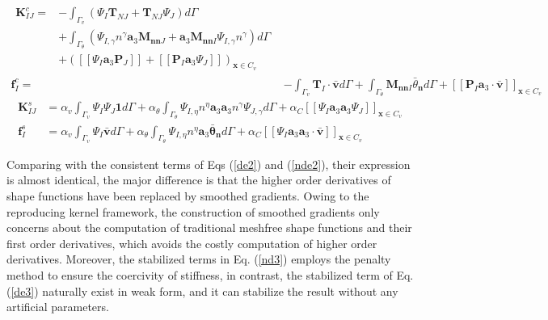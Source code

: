 \begin{subequations}\label{nde2}
\begin{align}
\begin{split}
\boldsymbol K^c_{IJ} = &- \int_{\Gamma_v} (\Psi_I \boldsymbol T_{NJ} + \boldsymbol T_{NJ} \Psi_J) d\Gamma \\
                                     &+ \int_{\Gamma_\theta} (\Psi_{I,\gamma} n^\gamma \boldsymbol a_3 \boldsymbol M_{\boldsymbol{nn}J} + \boldsymbol a_3 \boldsymbol M_{\boldsymbol{nn}I} \Psi_{I,\gamma}n^\gamma)d\Gamma \\
                                     & + ([[\Psi_I \boldsymbol a_3 \boldsymbol P_J]] + [[\boldsymbol P_I \boldsymbol a_3 \Psi_J]])_{\boldsymbol x \in C_v}
\end{split} \\
\boldsymbol f^c_I = &- \int_{\Gamma_v} \boldsymbol T_I \cdot \bar{\boldsymbol v} d\Gamma + \int_{\Gamma_\theta} \boldsymbol M_{\boldsymbol{nn}I} \bar{\theta}_{\boldsymbol n} d\Gamma + [[\boldsymbol P_I\boldsymbol a_3 \cdot \bar{\boldsymbol v}]]_{\boldsymbol x \in C_v}
\end{align}
\end{subequations}
\begin{subequations}\label{nde3}
\begin{align}
\boldsymbol K^s_{IJ} &= \alpha_v \int_{\Gamma_v} \Psi_I \Psi_J \boldsymbol 1 d\Gamma 
+ \alpha_\theta \int_{\Gamma_\theta} \Psi_{I,\eta} n^\eta \boldsymbol a_3 \boldsymbol a_3 n^\gamma\Psi_{J,\gamma} d\Gamma + \alpha_C [[\Psi_I \boldsymbol a_3 \boldsymbol a_3 \Psi_J]]_{\boldsymbol x \in C_v} \\
\boldsymbol f^s_I &= \alpha_v \int_{\Gamma_v} \Psi_I \bar{\boldsymbol v} d\Gamma + \alpha_\theta \int_{\Gamma_\theta} \Psi_{I,\eta} n^\eta \boldsymbol a_3 \boldsymbol \bar \theta_{\boldsymbol n} d\Gamma + \alpha_C [[\Psi_I \boldsymbol a_3 \boldsymbol a_3 \cdot \bar{\boldsymbol v}]]_{\boldsymbol x \in C_v}
\end{align}
\end{subequations}

Comparing with the consistent terms of Eqs (\ref{de2}) and (\ref{nde2}), their expression is almost identical, the major difference is that the higher order derivatives of shape functions have been replaced by smoothed gradients. Owing to the reproducing kernel framework, the construction of smoothed gradients only concerns about the computation of traditional meshfree shape functions and their first order derivatives, which avoids the costly computation of higher order derivatives. Moreover, the stabilized terms in Eq. (\ref{nd3}) employs the penalty method to ensure the coercivity of stiffness, in contrast, the stabilized term of Eq. (\ref{de3}) naturally exist in weak form, and it can stabilize the result without any artificial parameters.
 
